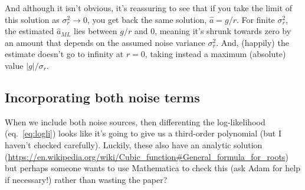 \documentclass[11pt]{article}
\renewcommand{\eqref}[1]{eq.~\ref{eq:#1}}
\newcommand{\vr}{\sigma^2_r}
\begin{document}
And although it isn't obvious, it's reassuring to see that if you take
the limit of this solution as $\vr \rightarrow 0$, you get back the
same solution, $\hat a = g/r$. For finite $\vr$, the estimated $\hat
a_{ML}$ lies between $g/r$ and 0, meaning it's shrunk towards zero by
an amount that depends on the assumed noise variance $\vr$. And,
(happily) the estimate doesn't go to infinity at $r=0$, taking instead
a maximum (absolute) value  $|g|/\sigma_r$.

\subsection{Incorporating both noise terms}

When we include both noise sources, then differenting the
log-likelihood (\eqref{logli}) looks like it's going to give us a
third-order polynomial (but I haven't checked carefully).  Luckily,
these also have an analytic solution (\url{https://en.wikipedia.org/wiki/Cubic_function#General_formula_for_roots})
but perhaps someone wants to use Mathematica to check this (ask Adam
for help if necessary!) rather than wasting the paper?



%
%
\end{document}
